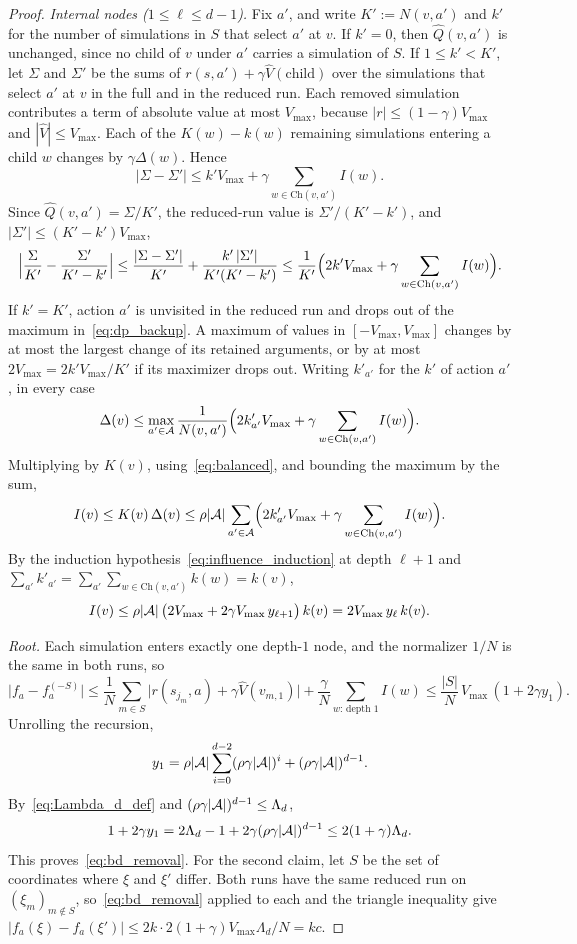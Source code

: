 \begin{proof}
\emph{Internal nodes ($1\le\ell\le d-1$).}
Fix $a'$, and write $K':=N(v,a')$ and $k'$ for the number of simulations in $S$ that select $a'$ at $v$.
If $k'=0$, then $\hat Q(v,a')$ is unchanged, since no child of $v$ under $a'$ carries a simulation of $S$.
If $1\le k'<K'$, let $\Sigma$ and $\Sigma'$ be the sums of $r(s,a')+\gamma\hat V(\text{child})$ over the simulations that select $a'$ at $v$ in the full and in the reduced run.
Each removed simulation contributes a term of absolute value at most $V_{\max}$, because $|r|\le(1-\gamma)V_{\max}$ and $|\hat V|\le V_{\max}$.
Each of the $K(w)-k(w)$ remaining simulations entering a child $w$ changes by $\gamma\Delta(w)$.
Hence
\[
|\Sigma-\Sigma'|\le k'V_{\max}+\gamma\sum_{w\in\mathrm{Ch}(v,a')}I(w).
\]
Since $\hat Q(v,a')=\Sigma/K'$, the reduced-run value is $\Sigma'/(K'-k')$, and $|\Sigma'|\le(K'-k')V_{\max}$,
\[
\Bigl|\frac{\Sigma}{K'}-\frac{\Sigma'}{K'-k'}\Bigr|
\le\frac{|\Sigma-\Sigma'|}{K'}+\frac{k'\,|\Sigma'|}{K'(K'-k')}
\le\frac{1}{K'}\Bigl(2k'V_{\max}+\gamma\sum_{w\in\mathrm{Ch}(v,a')}I(w)\Bigr).
\]
If $k'=K'$, action $a'$ is unvisited in the reduced run and drops out of the maximum in~\eqref{eq:dp_backup}.
A maximum of values in $[-V_{\max},V_{\max}]$ changes by at most the largest change of its retained arguments, or by at most $2V_{\max}=2k'V_{\max}/K'$ if its maximizer drops out.
Writing $k'_{a'}$ for the $k'$ of action $a'$, in every case
\[
\Delta(v)\le\max_{a'\in{\mathcal{A}}}\frac{1}{N(v,a')}\Bigl(2k'_{a'}V_{\max}+\gamma\sum_{w\in\mathrm{Ch}(v,a')}I(w)\Bigr).
\]
Multiplying by $K(v)$, using~\eqref{eq:balanced}, and bounding the maximum by the sum,
\[
I(v)\le K(v)\,\Delta(v)\le\rho|{\mathcal{A}}|\sum_{a'\in{\mathcal{A}}}\Bigl(2k'_{a'}V_{\max}+\gamma\sum_{w\in\mathrm{Ch}(v,a')}I(w)\Bigr).
\]
By the induction hypothesis~\eqref{eq:influence_induction} at depth $\ell+1$ and $\sum_{a'}k'_{a'}=\sum_{a'}\sum_{w\in\mathrm{Ch}(v,a')}k(w)=k(v)$,
\[
I(v)\le\rho|{\mathcal{A}}|\,\bigl(2V_{\max}+2\gamma V_{\max}\,y_{\ell+1}\bigr)\,k(v)=2V_{\max}\,y_\ell\,k(v).
\]

\emph{Root.}
Each simulation enters exactly one depth-$1$ node, and the normalizer $1/N$ is the same in both runs, so
\[
\bigl|f_a-f_a^{(-S)}\bigr|
\le\frac1N\sum_{m\in S}\bigl|r(s_{j_m},a)+\gamma\hat V(v_{m,1})\bigr|+\frac{\gamma}{N}\sum_{w:\,\text{depth }1}I(w)
\le\frac{|S|}{N}\,V_{\max}\,(1+2\gamma y_1).
\]
Unrolling the recursion,
\[
y_1=\rho|{\mathcal{A}}|\sum_{i=0}^{d-2}(\rho\gamma|{\mathcal{A}}|)^i+(\rho\gamma|{\mathcal{A}}|)^{d-1}.
\]
By~\eqref{eq:Lambda_d_def} and $(\rho\gamma|{\mathcal{A}}|)^{d-1}\le\Lambda_d$,
\[
1+2\gamma y_1=2\Lambda_d-1+2\gamma(\rho\gamma|{\mathcal{A}}|)^{d-1}\le2(1+\gamma)\Lambda_d.
\]
This proves~\eqref{eq:bd_removal}.
For the second claim, let $S$ be the set of coordinates where $\xi$ and $\xi'$ differ.
Both runs have the same reduced run on $(\xi_m)_{m\notin S}$, so~\eqref{eq:bd_removal} applied to each and the triangle inequality give $|f_a(\xi)-f_a(\xi')|\le 2k\cdot2(1+\gamma)V_{\max}\Lambda_d/N=kc$.
\end{proof}

